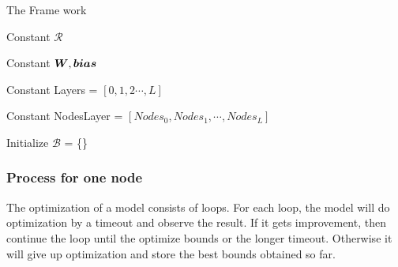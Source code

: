 \begin{algorithm}
	\caption{The Frame work}
	
	Constant $\mathcal{R}$  
	
	Constant $\boldsymbol{W}, \boldsymbol{bias}$ 
	
	Constant Layers = $[0,1,2\cdots,L]$ 
	
	Constant NodesLayer = $[Nodes_0,Nodes_1,\cdots, Nodes_L]$ 
	
	
	Initialize $\mathcal{B}$ = \{\} 
	
	
	
\end{algorithm}

\subsubsection*{Process for one node}

The optimization of a model consists of loops. For each loop, the model will do optimization by a timeout and observe the result. If it gets improvement, then continue the loop until the optimize bounds or the longer timeout. Otherwise it will give up optimization and store the best bounds obtained so far.  



